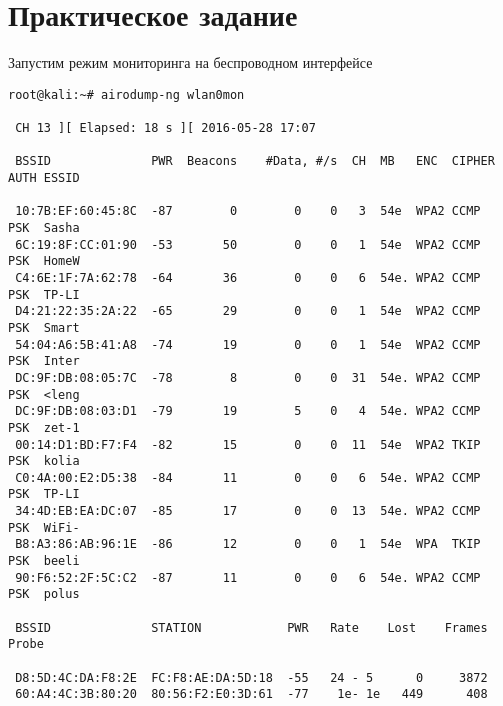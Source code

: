 \documentclass[10pt,a4paper]{report}
\begin{document}
	\section{Практическое задание}
		Запустим режим мониторинга на беспроводном интерфейсе
		\begin{lstlisting}
root@kali:~# airodump-ng wlan0mon

 CH 13 ][ Elapsed: 18 s ][ 2016-05-28 17:07                                    
                                                                               
 BSSID              PWR  Beacons    #Data, #/s  CH  MB   ENC  CIPHER AUTH ESSID
                                                                               
 10:7B:EF:60:45:8C  -87        0        0    0   3  54e  WPA2 CCMP   PSK  Sasha
 6C:19:8F:CC:01:90  -53       50        0    0   1  54e  WPA2 CCMP   PSK  HomeW
 C4:6E:1F:7A:62:78  -64       36        0    0   6  54e. WPA2 CCMP   PSK  TP-LI
 D4:21:22:35:2A:22  -65       29        0    0   1  54e  WPA2 CCMP   PSK  Smart
 54:04:A6:5B:41:A8  -74       19        0    0   1  54e  WPA2 CCMP   PSK  Inter
 DC:9F:DB:08:05:7C  -78        8        0    0  31  54e. WPA2 CCMP   PSK  <leng
 DC:9F:DB:08:03:D1  -79       19        5    0   4  54e. WPA2 CCMP   PSK  zet-1
 00:14:D1:BD:F7:F4  -82       15        0    0  11  54e  WPA2 TKIP   PSK  kolia 
 C0:4A:00:E2:D5:38  -84       11        0    0   6  54e. WPA2 CCMP   PSK  TP-LI 
 34:4D:EB:EA:DC:07  -85       17        0    0  13  54e. WPA2 CCMP   PSK  WiFi-
 B8:A3:86:AB:96:1E  -86       12        0    0   1  54e  WPA  TKIP   PSK  beeli
 90:F6:52:2F:5C:C2  -87       11        0    0   6  54e. WPA2 CCMP   PSK  polus                    
                                               
 BSSID              STATION            PWR   Rate    Lost    Frames  Probe                                                            
                                                  
 D8:5D:4C:DA:F8:2E  FC:F8:AE:DA:5D:18  -55   24 - 5      0     3872                                                                   
 60:A4:4C:3B:80:20  80:56:F2:E0:3D:61  -77    1e- 1e   449      408     
		\end{lstlisting}
		
\end{document}
